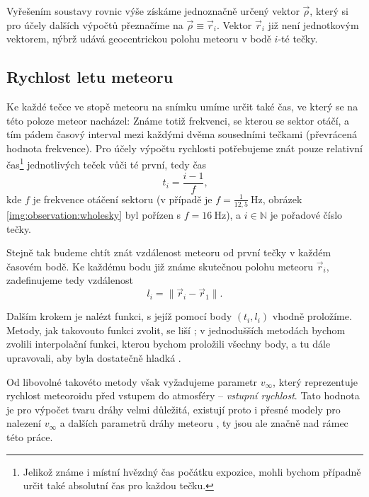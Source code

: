 Vyřešením soustavy rovnic výše získáme jednoznačně určený vektor $\vec{\rho}$, který si pro účely dalších výpočtů přeznačíme na $\vec{\rho}\equiv\vec{r}_i$. Vektor $\vec{r}_i$ již není jednotkovým vektorem, nýbrž udává geocentrickou polohu meteoru v bodě $i$-té tečky.%

\subsection{Rychlost letu meteoru}%
Ke každé tečce ve stopě meteoru na snímku umíme určit také čas, ve který se na této poloze meteor nacházel: Známe totiž frekvenci, se kterou se sektor otáčí, a tím pádem časový interval mezi každými dvěma sousedními tečkami (převrácená hodnota frekvence). Pro účely výpočtu rychlosti potřebujeme znát pouze relativní čas\footnote{Jelikož známe i místní hvězdný čas počátku expozice, mohli bychom případně určit také absolutní čas pro každou tečku.} jednotlivých teček vůči té první, tedy čas
\begin{equation}
    t_i=\frac{i-1}{f}\text{,}
\end{equation}
kde $f$ je frekvence otáčení sektoru (v případě \cite{ceplecha} je $f=\frac{1}{12{,}5}\:\text{Hz}$, obrázek \ref{img:observation:wholesky} byl pořízen s $f=16\:\text{Hz}$), a $i\in\mathbb{N}$ je pořadové číslo tečky.

Stejně tak budeme chtít znát vzdálenost meteoru od první tečky v každém časovém bodě. Ke každému bodu již známe skutečnou polohu meteoru $\vec{r}_i$, zadefinujeme tedy vzdálenost
\begin{equation}
    l_i=\lVert\vec{r}_i-\vec{r}_1\rVert\text{.}
\end{equation}

\medskip

Dalším krokem je nalézt funkci, s jejíž pomocí body $\left(t_i,l_i\right)$ vhodně proložíme. Metody, jak takovouto funkci zvolit, se liší \cite{ceplecha}; v jednodušších metodách bychom zvolili interpolační funkci, kterou bychom proložili všechny body, a tu dále upravovali, aby byla dostatečně hladká \cite{ceplecha}.

Od libovolné takovéto metody však vyžadujeme parametr $v_\infty$, který reprezentuje rychlost meteoroidu před vstupem do atmosféry \cite{ceplecha} -- \textit{vstupní rychlost}. Tato hodnota je pro výpočet tvaru dráhy velmi důležitá, existují proto i přesné modely pro nalezení $v_\infty$ a dalších parametrů dráhy meteoru \cite{ceplecha}\cite{singlebodymeteor}, ty jsou ale značně nad rámec této práce.

